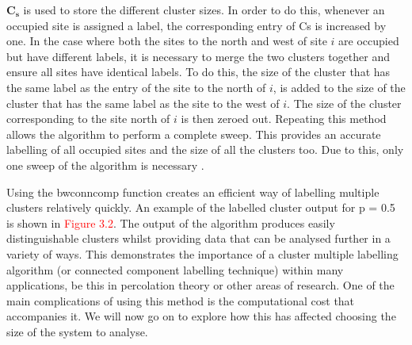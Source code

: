 $\mathbf{C_s}$ is used to store the different cluster sizes. In order to do this, whenever an occupied site is assigned a label, 
the corresponding entry of Cs is increased by one. In the case where both the sites to the north and west of site $i$ are occupied 
but have different labels, it is necessary to merge the two clusters together and ensure all sites have identical labels. 
To do this, the size of the cluster that has the same label as the entry of the site to the north of $i$, is
added to the size of the cluster that has the same label as the site to the west of $i$. The size of the cluster corresponding to the site
north of $i$ is then zeroed out. Repeating this method allows the algorithm to perform a complete sweep. 
This provides an accurate labelling of all occupied sites and the size of all the clusters too. Due to this, only one sweep of the
algorithm is necessary \cite{hoshen1976percolation}.

Using the bwconncomp function creates an efficient way of labelling multiple clusters relatively quickly. 
An example of the labelled cluster output for p = 0.5 is shown in \textcolor{red}{Figure 3.2}. 
The output of the algorithm produces easily distinguishable clusters whilst providing data that can be analysed further in a variety of ways. 
This demonstrates the importance of a cluster multiple labelling algorithm (or connected component labelling technique) within many applications, 
be this in percolation theory or other areas of research. 
One of the main complications of using this method is the computational cost that accompanies it. 
We will now go on to explore how this has affected choosing the size of the system to analyse.





